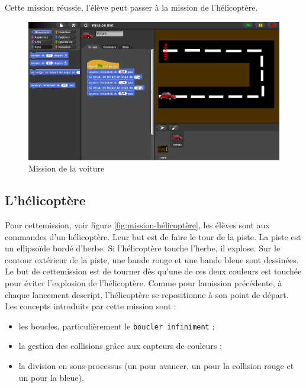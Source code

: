 Cette \gls{mission} réussie, l'élève peut passer à la \gls{mission} de l'hélicoptère.

\begin{figure}
  \begin{center}
    \includegraphics[width=\textwidth]{content/7-solution/1-missions/images/voiture}
    \caption{Mission de la voiture}
    \label{fig:mission-voiture}
  \end{center}
\end{figure}


\subsection{L'hélicoptère}
\label{mission-helicoptere}
Pour cette\gls{mission}, voir figure \ref{fig:mission-hélicoptère}, les élèves sont aux commandes d'un hélicoptère. Leur but est de faire le tour de la piste. La piste est un ellipsoïde bordé d'herbe. Si l'hélicoptère touche l'herbe, il explose. Sur le contour extérieur de la piste, une bande rouge et une bande bleue sont dessinées. Le but de cette\gls{mission} est de tourner dès qu'une de ces deux couleurs est touchée pour éviter l'explosion de l'hélicoptère. Comme pour la\gls{mission} précédente, à chaque lancement de\gls{script}, l'hélicoptère se repositionne à son point de départ.\\


Les concepts introduits par cette \gls{mission} sont :
\begin{itemize}
\item les boucles, particulièrement le \texttt{boucler infiniment} ;
\item la gestion des collisions grâce aux capteurs de couleurs ;
\item la division en sous-processus (un pour avancer, un pour la collision rouge et un pour la bleue).
\end{itemize}

